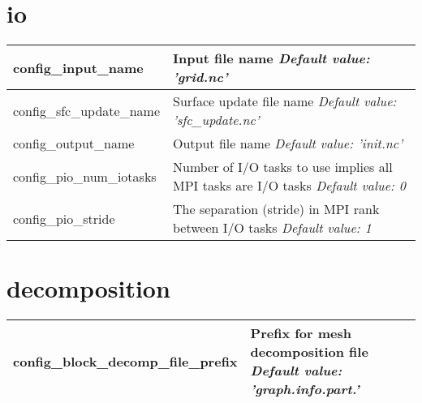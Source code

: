 \section{io}

{\small
\begin{longtable}{|p{1.75in} |p{4.5in}|}
 \hline
   config\_input\_name         & Input file name \newline 
   {\em Default value: 'grid.nc'} \\ \hline
   
   config\_sfc\_update\_name        & Surface update file name \newline 
   {\em Default value: 'sfc\_update.nc'} \\ \hline   
 
   config\_output\_name        & Output file name \newline 
   {\em Default value: 'init.nc'} \\ \hline

   config\_pio\_num\_iotasks        & Number of I/O tasks to use \hfill\break 0 implies all MPI tasks are I/O tasks \newline 
   {\em Default value: 0} \\ \hline

   config\_pio\_stride        & The separation (stride) in MPI rank between I/O tasks \newline 
   {\em Default value: 1} \\ \hline
   
\end{longtable}
}

\section{decomposition}

{\small
\begin{longtable}{|p{1.75in} |p{4.5in}|}
 \hline
   config\_block\_decomp\_file\_prefix & Prefix for mesh decomposition file \newline 
   {\em Default value: 'graph.info.part.'}  \\ \hline

\end{longtable}
}

